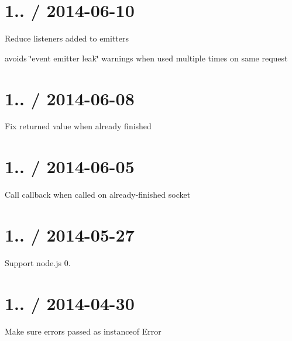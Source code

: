 \section*{1.. / 2014-\/06-\/10 }


\begin{DoxyItemize}
\item Reduce listeners added to emitters
\begin{DoxyItemize}
\item avoids \char`\"{}event emitter leak\char`\"{} warnings when used multiple times on same request
\end{DoxyItemize}
\end{DoxyItemize}

\section*{1.. / 2014-\/06-\/08 }


\begin{DoxyItemize}
\item Fix returned value when already finished
\end{DoxyItemize}

\section*{1.. / 2014-\/06-\/05 }


\begin{DoxyItemize}
\item Call callback when called on already-\/finished socket
\end{DoxyItemize}

\section*{1.. / 2014-\/05-\/27 }


\begin{DoxyItemize}
\item Support node.\+js 0.
\end{DoxyItemize}

\section*{1.. / 2014-\/04-\/30 }


\begin{DoxyItemize}
\item Make sure errors passed as instanceof {\ttfamily Error}
\end{DoxyItemize}

